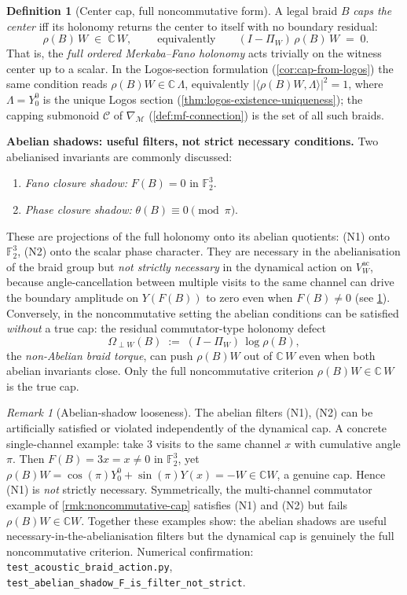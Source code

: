 \documentclass[11pt,a4paper]{article}
\theoremstyle{plain}
\theoremstyle{definition}
\newtheorem{definition}[theorem]{Definition}
\theoremstyle{remark}
\newtheorem{remark}[theorem]{Remark}
\numberwithin{equation}{section}
\newcommand{\Complex}{\mathbb{C}}
\newcommand{\F}{\mathbb{F}}
\begin{document}
\begin{definition}[Center cap, full noncommutative form]
\label{def:center-cap}
A legal braid $B$ \emph{caps the center} iff its holonomy returns
the center to itself with no boundary residual:
\[
  \boxed{\;\rho(B)\,W\;\in\;\Complex\,W,\;}
  \qquad
  \text{equivalently}\qquad
  (I-\Pi_W)\,\rho(B)\,W\;=\;0.
\]
That is, the \emph{full ordered Merkaba--Fano holonomy} acts trivially
on the witness center up to a scalar.  In the
Logos-section formulation (\cref{cor:cap-from-logos}) the same
condition reads $\rho(B)W\in\Complex\,\Lambda$, equivalently
$|\langle\rho(B)W,\Lambda\rangle|^2=1$, where $\Lambda=Y_0^0$ is
the unique Logos section
(\cref{thm:logos-existence-uniqueness}); the capping submonoid
$\mathcal{C}$ of $\nabla_{\mathcal{M}}$
(\cref{def:mf-connection}) is the set of all such braids.

\smallskip
\noindent\textbf{Abelian shadows: useful filters, not strict
necessary conditions.}  Two abelianised invariants are commonly
discussed:
\begin{enumerate}
  \item[\textup{(N1)}] \emph{Fano closure shadow:} $F(B)=0$ in
        $\F_2^3$.
  \item[\textup{(N2)}] \emph{Phase closure shadow:}
        $\theta(B)\equiv 0\pmod{\pi}$.
\end{enumerate}
These are projections of the full holonomy onto its abelian
quotients: (N1) onto $\F_2^3$, (N2) onto the scalar phase
character.  They are necessary in the abelianisation of the
braid group but \emph{not strictly necessary} in the dynamical
action on $V_W^{\mathrm{ac}}$, because angle-cancellation between
multiple visits to the same channel can drive the boundary
amplitude on $Y(F(B))$ to zero even when $F(B)\ne 0$
(see \cref{rmk:abelian-shadow-looseness}).  Conversely, in the
noncommutative setting the abelian conditions can be satisfied
\emph{without} a true cap: the residual commutator-type holonomy
defect
\[
  \Omega_{\perp W}(B)\;:=\;(I-\Pi_W)\,\log\rho(B),
\]
the \emph{non-Abelian braid torque}, can push $\rho(B)W$ out of
$\Complex\,W$ even when both abelian invariants close.  Only the
full noncommutative criterion $\rho(B)W\in\Complex\,W$ is the
true cap.
\end{definition}

\begin{remark}[Abelian-shadow looseness]
\label{rmk:abelian-shadow-looseness}
The abelian filters (N1), (N2) can be artificially satisfied or
violated independently of the dynamical cap.  A concrete
single-channel example: take $3$ visits to the same channel $x$
with cumulative angle $\pi$.  Then $F(B)=3x=x\ne 0$ in $\F_2^3$,
yet $\rho(B)W=\cos(\pi)Y_0^0+\sin(\pi)Y(x)=-W\in\Complex W$, a
genuine cap.  Hence (N1) is \emph{not} strictly necessary.
Symmetrically, the multi-channel commutator example of
\cref{rmk:noncommutative-cap} satisfies (N1) and (N2) but fails
$\rho(B)W\in\Complex W$.  Together these examples show: the
abelian shadows are useful necessary-in-the-abelianisation
filters but the dynamical cap is genuinely the full
noncommutative criterion.  Numerical confirmation:
\texttt{test\_acoustic\_braid\_action.py},
\texttt{test\_abelian\_shadow\_F\_is\_filter\_not\_strict}.
\end{remark}
\end{document}

